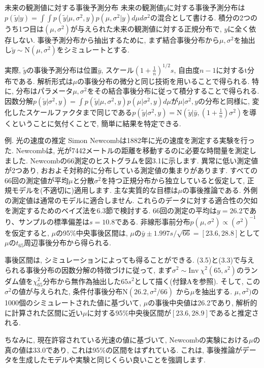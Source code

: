 \documentclass[10pt,dvipdfmx,a4]{beamer}
\begin{document}
\begin{frame}{未来の観測値に対する事後予測分布}
未来の観測値$\tilde{y}$に対する事後予測分布は$p(\tilde{y}|y)=\int \int p(\tilde{y}|\mu,\sigma^2,y)p(\mu,\sigma^2|y)d\mu d\sigma^2$の混合として書ける.
積分の2つのうち1つ目は$(\mu,\sigma^2)$が与えられた未来の観測値に対する正規分布で, $y$に全く依存しない.
事後予測分布から抽出するために, まず結合事後分布から$\mu, \sigma^2$を抽出し$\tilde{y}\sim \text{N}(\mu,\sigma^2)$をシミュレートとする.

実際, $\tilde{y}$の事後予測分布は位置$\bar{y}$, スケール$(1+\tfrac{1}{n})^{1/2}s$, 自由度$n-1$に対するt分布である.
解析形式は$\mu$の事後分布の微分と同じ技術を用いることで得られる.
特に, 分布はパラメータ$\mu,\sigma^2$をその結合事後分布に従って積分することで得られる.
因数分解$p(\tilde{y}|\sigma^2, y)= \int p(\tilde{y}|\mu, \sigma^2,y)p(\mu|\sigma^2, y)d\mu$が$\mu|\sigma^2, y$の分布と同様に, 変化したスケールファクタまで同じである$p(\tilde{y}|\sigma^2, y)=\text{N}(\tilde{y} | \bar{y}, (1 +\tfrac{1}{n})\sigma^2)$を導くということに気付くことで, 簡単に結果を特定できる.
\end{frame}


\begin{frame}{例. 光の速度の推定}
Simon Newcombは1882年に光の速度を測定する実験を行った.
Newcombは, 光が7442メートルの距離を移動するのに必要な時間量を測定しました.
Newcombの66測定のヒストグラムを図3.1に示します.
異常に低い測定値が2つあり, おおよそ対称的に分布している測定値の集まりがあります.
すべての66回の測定値が平均$\mu$と分散$\sigma^2$を持つ正規分布から独立していると仮定して, 正規モデルを(不適切に)適用します.
主な実質的な目標は$\mu$の事後推論である.
外側の測定値は通常のモデルに適合しません.
これらのデータに対する適合性の欠如を測定するためのベイズ法を6.3節で検討する.
66回の測定の平均は$y = 26.2$であり、サンプルの標準偏差は$s = 10.8$である.
非線形事前分布$p(\mu,\sigma^2)\propto(\sigma^2)^{-1}$を仮定すると, $\mu$の95\%中央事後区間は, $\mu$の$\bar{y}\pm 1.997s/\sqrt{66}= [23.6,28.8]$として$\mu$の$t_{65}$周辺事後分布から得られる.
\end{frame}


\begin{frame}
事後区間は, シミュレーションによっても得ることができる.
(3.5)と(3.3)で与えられる事後分布の因数分解の特徴づけに従って, まず$\sigma^2\sim \text{Inv}\ \chi^2(65, s^2)$のランダム値を$\chi^2_65$分布から無作為抽出した$65s^2$として描く(付録Aを参照).
そして, この$\sigma^2$の値が与えられた, 条件付事後分布$\text{N}(26.2, \sigma^2/66)$ から$\mu$を抽出する.
$\mu,\sigma^2)$の1000個のシミュレートされた値に基づいて, $\mu$の事後中央値は26.2であり, 解析的に計算された区間に近い$\mu$に対する95\%中央後区間が$[23.6,28.9]$であると推定される.

ちなみに, 現在許容されている光速の値に基づいて, Newcombの実験における$\mu$の真の値は33.0であり, これは95\%の区間をはずれている.
これは, 事後推論がデータを生成したモデルや実験と同じくらい良いことを強調します.
\end{frame}
\end{document}
